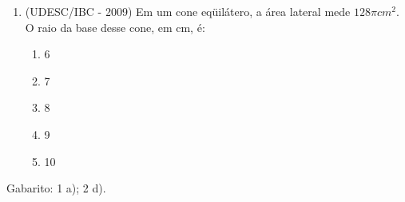 \begin{enumerate}
 \item (UDESC/IBC - 2009) Em um cone eqüilátero, a área lateral mede $128 \pi cm^2$. O raio da base desse cone, em cm, é:
 \begin{enumerate}
  \item 6
  \item 7
  \item 8
  \item 9
  \item 10
 \end{enumerate}
 
 \end{enumerate}
 
 Gabarito: 1 a); 2 d).
 
